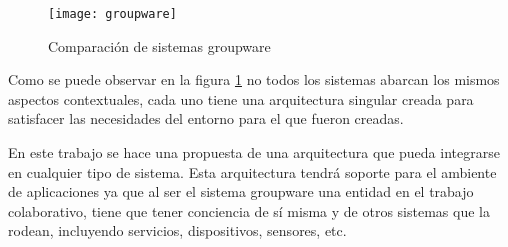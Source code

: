 \begin{figure}[h!]
  \centering
    \texttt{[image: groupware]}
  \caption{Comparaci\'on de sistemas groupware}
  \label{cmp:gw}
\end{figure}

Como se puede observar en la figura \ref{cmp:gw} no todos los sistemas abarcan los mismos aspectos contextuales, cada uno tiene una arquitectura singular creada para satisfacer las necesidades del entorno para el que fueron creadas. 

En este trabajo se hace una propuesta de una arquitectura que pueda integrarse en cualquier tipo de sistema. Esta arquitectura tendr\'a soporte para el ambiente de aplicaciones ya que al ser el sistema groupware una entidad en el trabajo colaborativo, tiene que tener conciencia de s\'i misma y de otros sistemas que la rodean, incluyendo servicios, dispositivos, sensores, etc.

